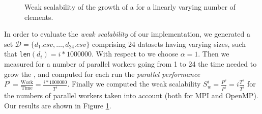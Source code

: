 \documentclass{article}
\begin{document}
\begin{figure}[b!]
    \centering
    \begin{subfigure}[b]{0.4\textwidth}
        \centering
    \end{subfigure}
    \hspace{1cm}
    \begin{subfigure}[b]{0.4\textwidth}
        \centering
    \end{subfigure}
    \caption{Weak scalability of the growth of a \kdtree{} for a linearly varying number of elements.}
    \label{fig:weak_scaling}
\end{figure}
In order to evaluate the \emph{weak scalability} of our implementation, we
generated a set $\mathcal{D} = \{d_1.csv, \dots, d_{24}.csv\}$ comprising 24
datasets having varying sizes, such that \texttt{len}$(d_i) = i * 1000000$. With
respect to \cite[Chapter~5.3.2]{hager2010introduction} we choose $\alpha = 1$. Then we
measured for a number of parallel workers going from 1 to 24 the time needed to
grow the \kdtree{}, and computed for each run the \emph{parallel performance}
$P^i = \frac{\text{Work}}{\text{Time}} = \frac{i * 1000000}{T^i}$. Finally we
computed the weak scalability $S_w^i = \frac{P^s}{P^i} = i \frac{T^s}{T^i}$ for
the numbers of parallel workers taken into account (both for MPI and OpenMP).
Our results are shown in Figure \ref{fig:weak_scaling}.
\end{document}
